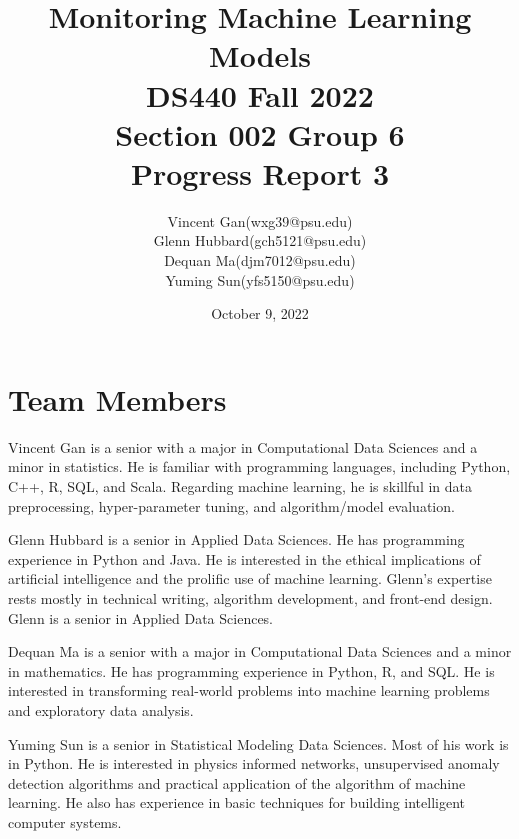 \documentclass[
	letterpaper, %
	12pt, %
]{CSUniSchoolLabReport}
\title{Monitoring Machine Learning Models \\ DS440 Fall 2022 \\ Section 002 Group 6 \\ Progress Report 3} %
\author{Vincent Gan(wxg39@psu.edu) \\ Glenn Hubbard(gch5121@psu.edu) \\ Dequan Ma(djm7012@psu.edu) \\ Yuming Sun(yfs5150@psu.edu)} %
\date{October 9, 2022} %
\begin{document}
\maketitle %




\section{Team Members}
\indent Vincent Gan is a senior with a major in Computational Data Sciences and a minor in statistics. He is familiar with programming languages, including Python, C++, R, SQL, and Scala. Regarding machine learning, he is skillful in data preprocessing, hyper-parameter tuning, and algorithm/model evaluation.\par
Glenn Hubbard is a senior in Applied Data Sciences. He has programming experience in Python and Java. He is interested in the ethical implications of artificial intelligence and the prolific use of machine learning. Glenn’s expertise rests mostly in technical writing, algorithm development, and front-end design. Glenn is a senior in Applied Data Sciences. \par
Dequan Ma is a senior with a major in Computational Data Sciences and a minor in mathematics. He has programming experience in Python, R, and SQL. He is interested in transforming real-world problems into machine learning problems and exploratory data analysis.\par
Yuming Sun is a senior in Statistical Modeling Data Sciences. Most of his work is in Python. He is interested in physics informed networks, unsupervised anomaly detection algorithms and practical application of the algorithm of machine learning. He also has experience in basic techniques for building intelligent computer systems.

 
\end{document}
